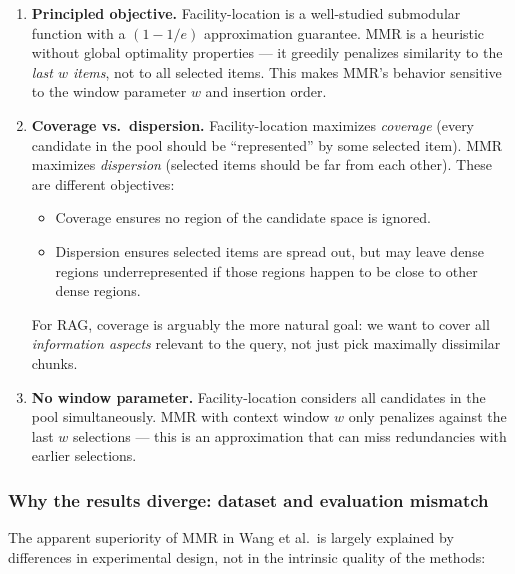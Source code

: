 \documentclass[11pt,a4paper]{article}
\begin{document}
\begin{enumerate}[leftmargin=*]
	\item \textbf{Principled objective.} Facility-location is a well-studied submodular function with a $(1 - 1/e)$ approximation guarantee. MMR is a heuristic without global optimality properties --- it greedily penalizes similarity to the \emph{last $w$ items}, not to all selected items. This makes MMR's behavior sensitive to the window parameter $w$ and insertion order.
	\item \textbf{Coverage vs.\ dispersion.} Facility-location maximizes \emph{coverage} (every candidate in the pool should be ``represented'' by some selected item). MMR maximizes \emph{dispersion} (selected items should be far from each other). These are different objectives:
	      \begin{itemize}
		      \item Coverage ensures no region of the candidate space is ignored.
		      \item Dispersion ensures selected items are spread out, but may leave dense regions underrepresented if those regions happen to be close to other dense regions.
	      \end{itemize}
	      For RAG, coverage is arguably the more natural goal: we want to cover all \emph{information aspects} relevant to the query, not just pick maximally dissimilar chunks.
	\item \textbf{No window parameter.} Facility-location considers all candidates in the pool simultaneously. MMR with context window $w$ only penalizes against the last $w$ selections --- this is an approximation that can miss redundancies with earlier selections.
\end{enumerate}

\subsubsection{Why the results diverge: dataset and evaluation mismatch}

The apparent superiority of MMR in Wang et al.\ is largely explained by differences in experimental design, not in the intrinsic quality of the methods:
\end{document}
